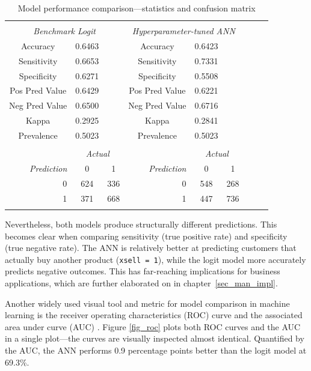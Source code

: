 \documentclass[12pt,a4paper]{article}
\let\code=\texttt
\begin{document}
\begin{table}[!htbp] \centering
\caption{Model performance comparison---statistics and confusion matrix}
\label{tab_comparemodel} 
{\small
\begin{tabular}{@{\extracolsep{5pt}} ccccccccc} 
\\[-1.8ex]\hline 
\hline \\[-1.8ex] 
\multicolumn{3}{c}{\textit{Benchmark Logit}} & \multicolumn{3}{c}{\textit{Hyperparameter-tuned ANN}} \\ \hline
Accuracy & 0.6463 &  & Accuracy & 0.6423 &  \\
Sensitivity & 0.6653 &  & Sensitivity & 0.7331 &  \\
Specificity & 0.6271 &  & Specificity & 0.5508 &  \\
Pos Pred Value & 0.6429 &  & Pos Pred Value & 0.6221 &  \\
Neg Pred Value & 0.6500 &  & Neg Pred Value & 0.6716 &  \\
Kappa & 0.2925 &  & Kappa & 0.2841 &  \\
Prevalence & 0.5023 &  & Prevalence & 0.5023 &  \\
\hline \\[-1.8ex] 
 & \multicolumn{2}{c}{\textit{Actual}} &  & \multicolumn{2}{c}{\textit{Actual}} \\
\multicolumn{1}{r}{\textit{Prediction}} & 0 & \multicolumn{1}{c}{1} & \multicolumn{1}{r}{\textit{Prediction}} & 0 & \multicolumn{1}{c}{1} \\ 
\multicolumn{1}{r}{0} & 624 & \multicolumn{1}{c}{336} & \multicolumn{1}{r}{0} & 548 & \multicolumn{1}{c}{268} \\
\multicolumn{1}{r}{1} & 371 & \multicolumn{1}{c}{668} & \multicolumn{1}{r}{1} & 447 & \multicolumn{1}{c}{736} \\
\hline \\[-1.8ex] 
\end{tabular}
}
\end{table}
Nevertheless, both models produce structurally different predictions.
This becomes clear when comparing sensitivity (true positive rate) and specificity (true negative rate).
The ANN is relatively better at predicting customers that actually buy another product (\code{xsell = 1}),
while the logit model more accurately predicts negative outcomes.
This has far-reaching implications for business applications, which are further elaborated on in chapter~\ref{sec_man_impl}.

Another widely used visual tool and metric for model comparison in machine learning is the receiver operating characteristics (ROC) curve and the associated
area under curve (AUC) \citep{fawcettIntroductionROCAnalysis2006}.
Figure \ref{fig_roc} plots both ROC curves and the AUC in a single plot---the curves are visually inspected almost identical.
Quantified by the AUC, the ANN performs 0.9 percentage points better than the logit model at 69.3\%.
\end{document}
